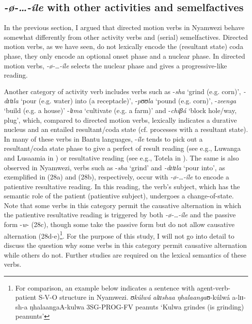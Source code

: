 \documentclass[output=paper,newtxmath,modfonts,nonflat,draftmode]{langsci/langscibook}
\begin{document}
\subsection{\textit{-}\textit{ø-…-íle} with other activities and semelfactives} \label{sec:kanijo:4.4}

In the previous section, I argued that directed motion verbs in Nyamwezi behave somewhat differently from other activity verbs and (serial) semelfactives. Directed motion verbs, as we have seen, do not lexically encode the (resultant state) coda phase, they only encode an optional onset phase and a nuclear phase. In directed motion verbs, \textit{-ø-}\textit{…-íle} selects the nuclear phase and gives a progressive-like reading.

Another category of activity verb includes verbs such as -\textit{sha} ‘grind (e.g. corn)’, \textit{-dɪ}\textit{tɪ}\textit{la} ‘pour (e.g. water) into (a receptacle)’, -\textit{pʊʊ}\textit{la} ‘pound (e.g. corn)’, -\textit{zeenga} ‘build (e.g. a house)’ -\textit{lɪ}\textit{ma} ‘cultivate (e.g. a farm)’ and -\textit{chiβá} ‘block hole/way, plug’, which, compared to directed motion verbs, lexically indicates a durative nucleus and an entailed resultant/coda state (cf.  processes with a resultant state). In many of these verbs in Bantu languages, -\textit{íle} tends to pick out a resultant/coda state phase to give a perfect of result reading (see e.g., Luwanga and Lusaamia in \citet{Botne2010}) or resultative reading (see e.g., Totela in \citet{Crane2013}). The same is also observed in Nyamwezi, verbs such as -\textit{sha} ‘grind’ and \textit{-dɪ}\textit{tɪ}\textit{la} ‘pour into’, as exemplified in (28a) and (28b), respectively, occur with \textit{-ø}\textit{-…-íle} to encode a patientive resultative reading. In this reading, the verb’s subject, which has the semantic role of the patient (patientive subject), undergoes a change-of-state. Note that some verbs in this category permit the causative alternation in which the patientive resultative reading is triggered by both \textit{-ø}\textit{-…-íle} and the passive form -\textit{w}- (28c), though some take the passive form but do not allow causative alternation (28d-e)\footnote{For comparison, an example below indicates a sentence with agent-verb-patient S-V-O structure in Nyamwezi.       \textit{ʊkúlwá}    \textit{al}\textit{ɪɪshaa}          \textit{ŋhalaanga}ʊ-kúlwá  a-lɪɪ-sh-a         ŋhalaangaA-kulwa 3SG-PROG-FV peanuts ‘Kulwa grindes (is grinding) peanunts’}. For the purpose of this study, I will not go into detail to discuss the question why some verbs in this category permit causative alternation while others do not. Further studies are required on the lexical semantics of these verbs. 
\end{document}
